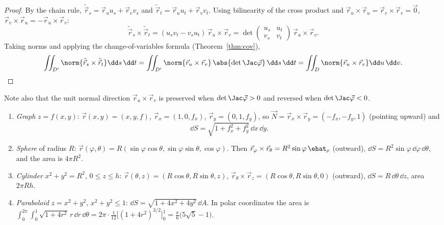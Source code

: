\begin{proof}
By the chain rule, $\tilde{\vec r}_s=\vec r_uu_s+\vec r_vv_s$ and $\tilde{\vec r}_t=\vec r_uu_t+\vec r_vv_t$. Using bilinearity of the cross product and $\vec r_u\times\vec r_u=\vec r_v\times\vec r_v=\vec 0$, $\vec r_v\times\vec r_u=-\vec r_u\times\vec r_v$:
\[
\tilde{\vec r}_s\times\tilde{\vec r}_t=(u_sv_t-v_su_t)\,\vec r_u\times\vec r_v=\det\begin{pmatrix}u_s&u_t\\v_s&v_t\end{pmatrix}\,\vec r_u\times\vec r_v .
\]
Taking norms and applying the change-of-variables formula (Theorem~\ref{thm:cov}),
\[
\iint_{D'}\norm{\tilde{\vec r}_s\times\tilde{\vec r}_t}\dd s\,\dd t=\iint_{D'}\norm{\vec r_u\times\vec r_v}\,\abs{\det\Jac\vec\varphi}\,\dd s\,\dd t=\iint_D\norm{\vec r_u\times\vec r_v}\dd u\,\dd v .\qedhere
\]
\end{proof}

Note also that the unit normal direction $\vec r_u\times\vec r_v$ is preserved when $\det\Jac\vec\varphi>0$ and reversed when $\det\Jac\vec\varphi<0$.

\begin{example}
\begin{enumerate}[label=(\alph*)]
  \item \emph{Graph} $z=f(x,y)$: $\vec r(x,y)=(x,y,f)$, $\vec r_x=(1,0,f_x)$, $\vec r_y=(0,1,f_y)$, so $\vec N=\vec r_x\times\vec r_y=(-f_x,-f_y,1)$ (pointing upward) and
  \[
  \dd S=\sqrt{1+f_x^2+f_y^2}\,\dd x\,\dd y .
  \]
  \item \emph{Sphere} of radius $R$: $\vec r(\varphi,\theta)=R(\sin\varphi\cos\theta,\sin\varphi\sin\theta,\cos\varphi)$. Then $\vec r_\varphi\times\vec r_\theta=R^2\sin\varphi\,\ehat_\rho$ (outward), $\dd S=R^2\sin\varphi\,\dd\varphi\,\dd\theta$, and the area is $4\pi R^2$.
  \item \emph{Cylinder} $x^2+y^2=R^2$, $0\le z\le h$: $\vec r(\theta,z)=(R\cos\theta,R\sin\theta,z)$, $\vec r_\theta\times\vec r_z=(R\cos\theta,R\sin\theta,0)$ (outward), $\dd S=R\,\dd\theta\,\dd z$, area $2\pi Rh$.
  \item \emph{Paraboloid} $z=x^2+y^2$, $x^2+y^2\le1$: $\dd S=\sqrt{1+4x^2+4y^2}\,\dd A$. In polar coordinates the area is $\int_0^{2\pi}\!\int_0^1\sqrt{1+4r^2}\,r\,\dd r\,\dd\theta=2\pi\cdot\frac1{12}\bigl[(1+4r^2)^{3/2}\bigr]_0^1=\frac\pi6\bigl(5\sqrt5-1\bigr)$.
\end{enumerate}
\end{example}

